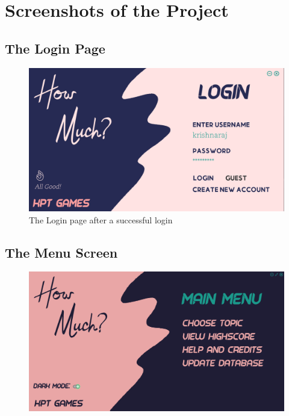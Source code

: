 \documentclass[11pt]{article}
\begin{document}
\section{Screenshots of the Project}

\subsection{The Login Page}
\begin{figure}[H]
	\centering
	\includegraphics[scale=0.45]{./design/Screenshots/Login Screen.png}
	\caption{The Login page after a successful login}
\end{figure}
\subsection{The Menu Screen}
\begin{figure}[H]
	\centering
	\includegraphics[scale=0.30]{./design/Screenshots/Main Menu Screen.png}
	\caption{}
\end{figure}
\end{document}
